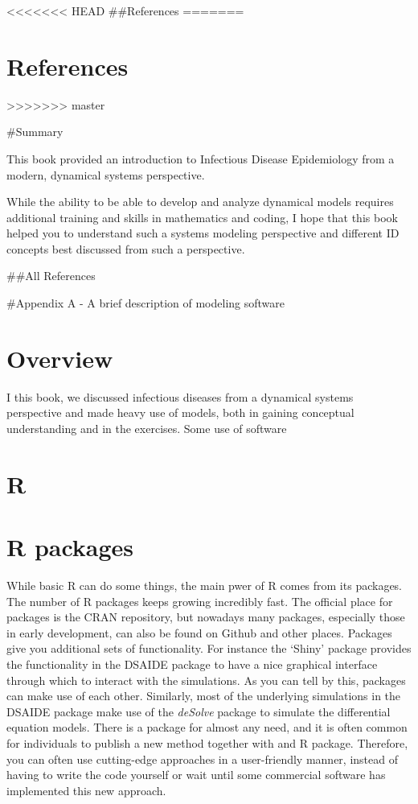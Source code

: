 \documentclass[]{book}
\theoremstyle{definition}
\theoremstyle{definition}
\theoremstyle{definition}
\theoremstyle{remark}
\begin{document}
<<<<<<< HEAD
\#\#References
=======
\section{References}\label{references-18}
>>>>>>> master

\#Summary

This book provided an introduction to Infectious Disease Epidemiology
from a modern, dynamical systems perspective.

While the ability to be able to develop and analyze dynamical models
requires additional training and skills in mathematics and coding, I
hope that this book helped you to understand such a systems modeling
perspective and different ID concepts best discussed from such a
perspective.

\#\#All References

\#Appendix A - A brief description of modeling software

\hypertarget{overview}{%
\section{Overview}\label{overview}}

I this book, we discussed infectious diseases from a dynamical systems
perspective and made heavy use of models, both in gaining conceptual
understanding and in the exercises. Some use of software

\hypertarget{r}{%
\section{R}\label{r}}

\hypertarget{r-packages}{%
\section{R packages}\label{r-packages}}

While basic R can do some things, the main pwer of R comes from its
packages. The number of R packages keeps growing incredibly fast. The
official place for packages is the CRAN repository, but nowadays many
packages, especially those in early development, can also be found on
Github and other places. Packages give you additional sets of
functionality. For instance the `Shiny' package provides the
functionality in the DSAIDE package to have a nice graphical interface
through which to interact with the simulations. As you can tell by this,
packages can make use of each other. Similarly, most of the underlying
simulations in the DSAIDE package make use of the \emph{deSolve} package
to simulate the differential equation models. There is a package for
almost any need, and it is often common for individuals to publish a new
method together with and R package. Therefore, you can often use
cutting-edge approaches in a user-friendly manner, instead of having to
write the code yourself or wait until some commercial software has
implemented this new approach.
\end{document}
